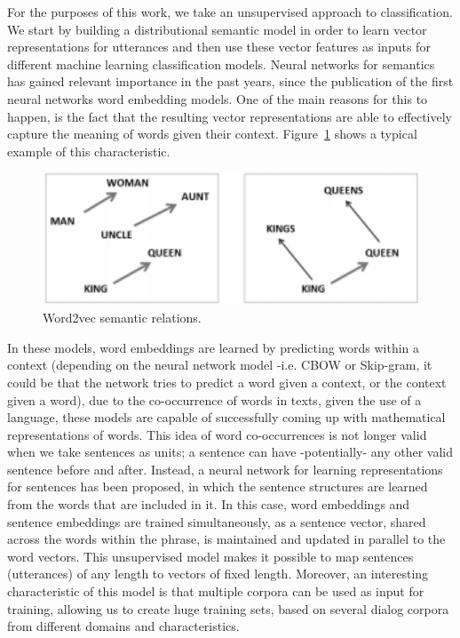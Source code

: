 For the purposes of this work, we take an unsupervised approach to classification. We start by building a distributional semantic model in order to learn vector representations for utterances and then use these vector features as inputs for different machine learning classification models. Neural networks for semantics has gained relevant importance in the past years, since the publication of the first neural networks word embedding models. One of the main reasons for this to happen, is the fact that the resulting vector representations are able to effectively capture the meaning of words given their context. Figure~\ref{fig:w2v_example} shows a typical example of this characteristic.

\begin{figure}
\centering
\begin{minipage}{.4\textwidth}
\includegraphics[width=1\textwidth]{img/w2v_example}
\caption{Word2vec semantic relations.}
\label{fig:w2v_example}
\end{minipage}
\end{figure}

In these models, word embeddings are learned by predicting words within a context (depending on the neural network model -i.e. CBOW or Skip-gram, it could be that the network tries to predict a word given a context, or the context given a word), due to the co-occurrence of words in texts, given the use of a language, these models are capable of successfully coming up with mathematical representations of words. This idea of word co-occurrences is not longer valid when we take sentences as units; a sentence can have -potentially- any other valid sentence before and after. Instead, a neural network for learning representations for sentences has been proposed, in which the sentence structures are learned from the words that are included in it.  In this case, word embeddings and sentence embeddings are trained simultaneously, as a sentence vector, shared across the words within the phrase, is maintained and updated in parallel to the word vectors.  This unsupervised model makes it possible to map sentences (utterances) of any length to vectors of fixed length. Moreover, an interesting characteristic of this model is that multiple corpora can be used as input for training, allowing us to create huge training sets, based on several dialog corpora from different domains and characteristics.

